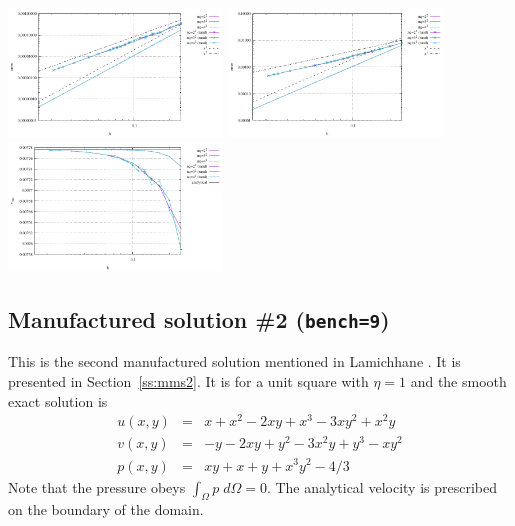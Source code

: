 \begin{center}
\includegraphics[width=5.7cm]{python_codes/fieldstone_76/results/mms1/errors_v}
\includegraphics[width=5.7cm]{python_codes/fieldstone_76/results/mms1/errors_p}
\includegraphics[width=5.7cm]{python_codes/fieldstone_76/results/mms1/vrms}
\end{center}

\subsection*{Manufactured solution \#2 ({\tt bench=9})}

This is the second manufactured solution 
mentioned in Lamichhane \cite{lami17}. It is presented in Section~\ref{ss:mms2}.
It is for a unit square with $\eta=1$ and the smooth exact solution is
\begin{eqnarray}
u(x,y) &=& x+x^2 - 2xy+x^3 - 3xy^2 + x^2y \\
v(x,y) &=& -y-2xy+y^2 -3x^2y + y^3 - xy^2 \\
p(x,y) &=& xy+x+y+x^3y^2 - 4/3
\end{eqnarray}
Note that the pressure obeys $\int_{\Omega} p \; d\Omega = 0$. The analytical 
velocity is prescribed on the boundary of the domain. 


